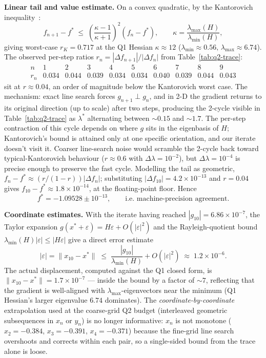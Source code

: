 \documentclass[11pt,a4paper]{article}
\begin{document}
\textbf{Linear tail and value estimate.}
On a convex quadratic, by the Kantorovich inequality~\cite{luenberger-ye}:
\[
f_{n+1}-f^{*} \;\le\; \left(\frac{\kappa-1}{\kappa+1}\right)^{\!2}\!(f_{n}-f^{*}), \qquad \kappa=\frac{\lambda_{\max}(H)}{\lambda_{\min}(H)},
\]
giving worst-case \(r_{K}=0.717\) at the Q1 Hessian \(\kappa\approx 12\) (\(\lambda_{\min}\approx 0.56,\,\lambda_{\max}\approx 6.74\)). The observed per-step ratios \(r_n=|\Delta f_{n+1}|/|\Delta f_n|\) from Table~\ref{tab:q2-trace}:
\[
\begin{array}{c|ccccccccc}
n & 1 & 2 & 3 & 4 & 5 & 6 & 7 & 8 & 9\\\hline
r_n & 0.034 & 0.044 & 0.039 & 0.034 & 0.034 & 0.040 & 0.039 & 0.044 & 0.043
\end{array}
\]
sit at \(r\approx 0.04\), an order of magnitude below the Kantorovich worst case. The mechanism: exact line search forces \(g_{n+1}\perp g_n\), and in 2-D the gradient returns to its original direction (up to scale) after two steps, producing the 2-cycle visible in Table~\ref{tab:q2-trace} as \(\lambda^{\ast}\) alternating between \(\sim 0.15\) and \(\sim 1.7\). The per-step contraction of this cycle depends on where \(g\) sits in the eigenbasis of \(H\); Kantorovich's bound is attained only at one specific orientation, and our iterate doesn't visit it. Coarser line-search noise would scramble the 2-cycle back toward typical-Kantorovich behaviour (\(r\approx 0.6\) with \(\Delta\lambda=10^{-2}\)), but \(\Delta\lambda=10^{-4}\) is precise enough to preserve the fast cycle. Modelling the tail as geometric, \(f_{n}-f^{\ast}\approx (r/(1-r))|\Delta f_{n}|\); substituting \(|\Delta f_{10}|=4.2\times 10^{-13}\) and \(r=0.04\) gives \(f_{10}-f^{\ast}\approx 1.8\times 10^{-14}\), at the floating-point floor. Hence
\[
\boxed{\;f^{\ast}=-1.09528\pm 10^{-13},\qquad\text{i.e.\ machine-precision agreement.}\;}
\]

\textbf{Coordinate estimates.}
With the iterate having reached \(|g_{10}|=6.86\times 10^{-7}\), the Taylor expansion \(g(x^{\ast}+\varepsilon)=H\varepsilon+O(|\varepsilon|^{2})\) and the Rayleigh-quotient bound \(\lambda_{\min}(H)|\varepsilon|\le|H\varepsilon|\) give a direct error estimate
\[
|\varepsilon|=\|x_{10}-x^{\ast}\|\;\le\;\frac{|g_{10}|}{\lambda_{\min}(H)}+O(|\varepsilon|^{2})\;\approx\;1.2\times 10^{-6}.
\]
The actual displacement, computed against the Q1 closed form, is \(\|x_{10}-x^{\ast}\|=1.7\times 10^{-7}\) --- inside the bound by a factor of \(\sim 7\), reflecting that the gradient is well-aligned with \(\lambda_{\max}\)-eigenvectors near the minimum (Q1 Hessian's larger eigenvalue \(6.74\) dominates). The \emph{coordinate-by-coordinate} extrapolation used at the coarse-grid Q2 budget (interleaved geometric subsequences in \(x_n\) or \(y_n\)) is no longer informative: \(x_n\) is not monotone (\(x_2=-0.384\), \(x_3=-0.391\), \(x_4=-0.371\)) because the fine-grid line search overshoots and corrects within each pair, so a single-sided bound from the trace alone is loose.
\end{document}
